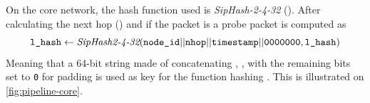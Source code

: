On the core network, the hash function used is \textit{SipHash-2-4-32}\cite{siphash} (\siphash). 
After calculating the next hop (\nhop) and if the packet is a probe packet \lhash is computed as
$$
\texttt{l\_hash} \leftarrow \textit{SipHash2-4-32}(\texttt{node\_id} || \texttt{nhop} || \texttt{timestamp} || \texttt{0000000}, \texttt{l\_hash})
$$
Meaning that a 64-bit string made of concatenating \nodeid, \nhop, \timestamp with the remaining bits set to \texttt{0} for padding is used as key for the \siphash function hashing \lhash. This is illustrated on \autoref{fig:pipeline-core}.
